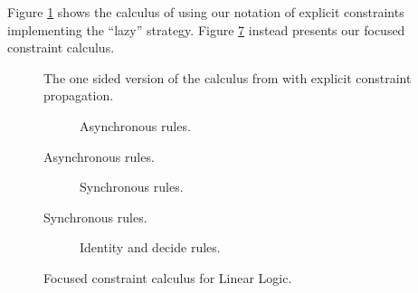 Figure \ref{fig:hp calculus} shows the calculus of \cite{HarlandPym} using our notation of explicit constraints implementing the ``lazy'' strategy.
Figure \ref{fig:calculus} instead presents our focused constraint calculus.
\begin{figure}[h!]
	\centering
	
	\caption{The one sided version of the calculus from \cite{HarlandPym} with explicit constraint propagation.\label{fig:hp calculus}}
\end{figure}
\begin{figure}[H]
	\begin{subfigure}{\textwidth}
		\centering
		
		\caption{Asynchronous rules.\label{fig:asy calculus}}
	\end{subfigure}
\end{figure}
\begin{figure}[H]
	\ContinuedFloat
	\begin{subfigure}{\textwidth}
		\centering
		
		\caption{Synchronous rules.\label{fig:sync calculus}}
	\end{subfigure}
\end{figure}
\begin{figure}[H]
	\ContinuedFloat
	\begin{subfigure}{\textwidth}
		\centering
		
		\caption{Identity and decide rules.\label{fig:id dec calculus}}
	\end{subfigure}
	\caption{Focused constraint calculus for Linear Logic. \label{fig:calculus}}
\end{figure}

